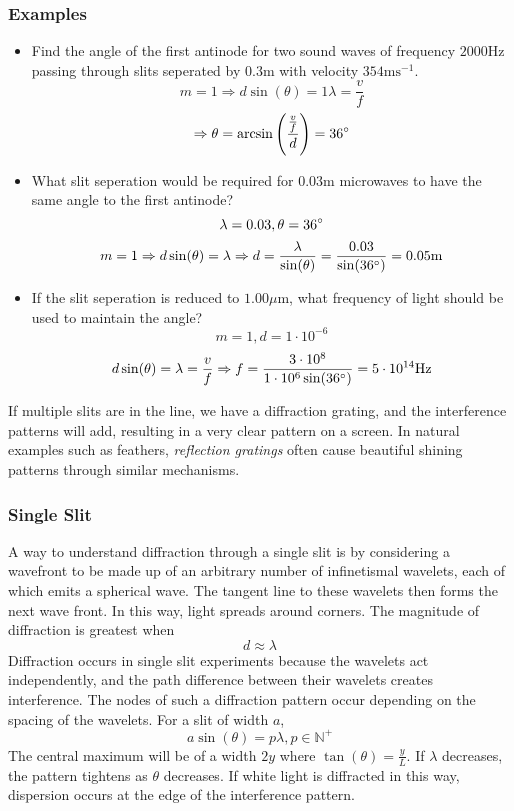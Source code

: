 \documentclass[12pt]{report}
\begin{document}
\begin{flushleft}
\subsubsection*{Examples}
\begin{itemize}
    \item Find the angle of the first antinode for two sound waves of frequency 
    \(2000\mathrm{Hz}\) passing through slits seperated by \(0.3\mathrm{m}\) 
    with velocity \(354\mathrm{ms}^{-1}\).
    \[m = 1 \Rightarrow d\sin(\theta) = 1\lambda = \frac{v}{f}\]
    \[\Rightarrow \theta = \arcsin\left(\frac{\frac{v}{f}}{d}\right) 
    = 36\degree\]
    \item What slit seperation would be required for \(0.03\mathrm{m}\) 
    microwaves to have the same angle to the first antinode?
    \[\lambda = 0.03, \theta = 36\degree\]
    \[m = 1 \Rightarrow d\sin(\theta) = \lambda \Rightarrow d 
    = \frac{\lambda}{\sin(\theta)} = \frac{0.03}{\sin(36\degree)} 
    = 0.05\mathrm{m}\]
    \item If the slit seperation is reduced to \(1.00\mu\mathrm{m}\), what
    frequency of light should be used to maintain the angle?
    \[m = 1, d = 1\cdot10^{-6}\]
    \[d\sin(\theta) = \lambda = \frac{v}{f} \Rightarrow f 
    = \frac{3\cdot10^8}{1\cdot10^6\sin(36\degree)} = 5\cdot10^{14}\mathrm{Hz}\]
\end{itemize}

If multiple slits are in the line, we have a diffraction grating, and the 
interference patterns will add, resulting in a very clear pattern on a screen.
In natural examples such as feathers, \textit{reflection gratings} often cause
beautiful shining patterns through similar mechanisms.

\subsubsection*{Single Slit}
A way to understand diffraction through a single slit is by considering a 
wavefront to be made up of an arbitrary number of infinetismal wavelets, each 
of which emits a spherical wave. The tangent line to these wavelets then forms
the next wave front. In this way, light spreads around corners. The magnitude
of diffraction is greatest when 
\[d \approx \lambda\]
Diffraction occurs in single slit experiments because the wavelets act 
independently, and the path difference between their wavelets creates 
interference. The nodes of such a diffraction pattern occur depending on the
spacing of the wavelets. For a slit of width \(a\),
\[a\sin(\theta) = p\lambda, p \in \mathbb{N}^{+}\]
The central maximum will be of a width \(2y\) where 
\(\tan(\theta) = \frac{y}{L}\). If \(\lambda\) decreases, the pattern tightens
as \(\theta\) decreases. If white light is diffracted in this way, dispersion
occurs at the edge of the interference pattern.


\end{flushleft}
\end{document}
